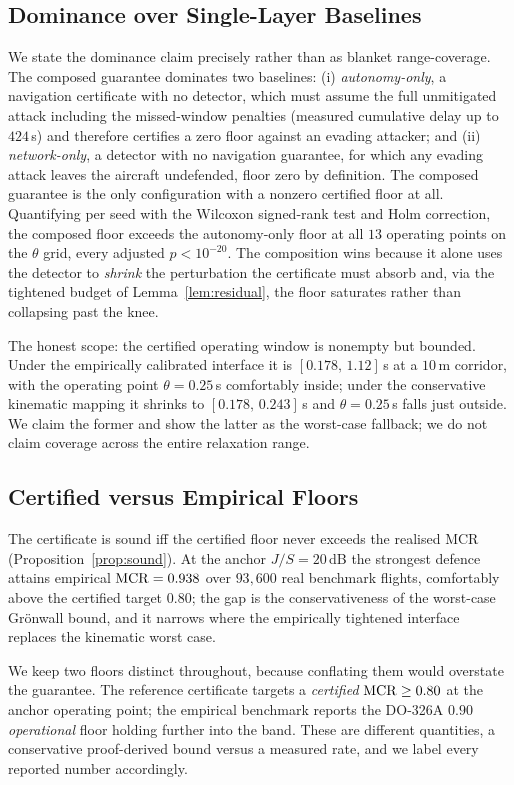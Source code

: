 \subsection{Dominance over Single-Layer Baselines}
\label{sec:dominance}
We state the dominance claim precisely rather than as blanket range-coverage.
The composed guarantee dominates two baselines: (i) \emph{autonomy-only}, a
navigation certificate with no detector, which must assume the full unmitigated
attack including the missed-window penalties (measured cumulative delay up to
$424$\,s) and therefore certifies a zero floor against an evading attacker; and
(ii) \emph{network-only}, a detector with no navigation guarantee, for which
any evading attack leaves the aircraft undefended, floor zero by definition.
The composed guarantee is the only configuration with a nonzero
certified floor at all. Quantifying per seed with the Wilcoxon signed-rank test
and Holm correction, the composed floor exceeds the autonomy-only floor at all
$13$ operating points on the $\theta$ grid, every adjusted $p<10^{-20}$. The
composition wins because it alone uses the detector to \emph{shrink} the
perturbation the certificate must absorb and, via the tightened budget of
Lemma~\ref{lem:residual}, the floor saturates rather than collapsing past the
knee.

The honest scope: the certified operating window is nonempty but bounded. Under
the empirically calibrated interface it is $[0.178,\,1.12]$\,s at a $10$\,m
corridor, with the operating point $\theta=0.25$\,s comfortably inside; under
the conservative kinematic mapping it shrinks to $[0.178,\,0.243]$\,s and
$\theta=0.25$\,s falls just outside. We claim the former and show the latter as
the worst-case fallback; we do not claim coverage across the entire relaxation
range.

\subsection{Certified versus Empirical Floors}
The certificate is sound iff the certified floor never exceeds the realised MCR
(Proposition~\ref{prop:sound}). At the anchor $J/S=20$\,dB the strongest defence
attains empirical $\mathrm{MCR}=0.938$ over $93{,}600$ real benchmark flights,
comfortably above the certified target $0.80$; the gap is the conservativeness
of the worst-case Gr\"onwall bound, and it narrows where the empirically
tightened interface replaces the kinematic worst case.

We keep two floors distinct throughout, because conflating them would overstate
the guarantee. The reference certificate targets a \emph{certified}
$\mathrm{MCR}\ge0.80$ at the anchor operating point; the empirical benchmark reports the
DO-326A $0.90$ \emph{operational} floor holding further into the band. These are
different quantities, a conservative proof-derived bound versus a measured
rate, and we label every reported number accordingly.

